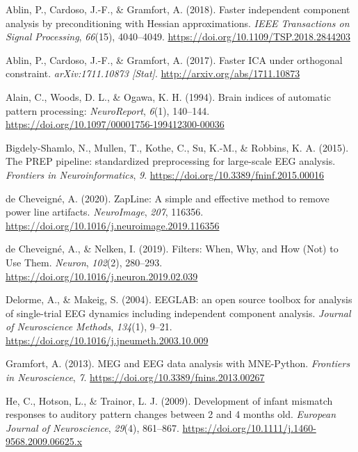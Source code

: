 \documentclass[stu,a4paper,11pt,floatsintext]{apa7}
\newenvironment{cslreferences}%
  {\setlength{\parindent}{0pt}%
  \everypar{\setlength{\hangindent}{\cslhangindent}}\ignorespaces}%
  {\par}
\newlength{\cslhangindent}
\begin{document}
\hypertarget{refs}{}
\begin{cslreferences}
\leavevmode\hypertarget{ref-ablinFasterIndependentComponent2018}{}%
Ablin, P., Cardoso, J.-F., \& Gramfort, A. (2018). Faster independent
component analysis by preconditioning with Hessian approximations.
\emph{IEEE Transactions on Signal Processing}, \emph{66}(15),
4040--4049. \url{https://doi.org/10.1109/TSP.2018.2844203}

\leavevmode\hypertarget{ref-ablinFasterICAOrthogonal2017}{}%
Ablin, P., Cardoso, J.-F., \& Gramfort, A. (2017). Faster ICA under
orthogonal constraint. \emph{arXiv:1711.10873 {[}Stat{]}}.
\url{http://arxiv.org/abs/1711.10873}

\leavevmode\hypertarget{ref-alainBrainIndicesAutomatic1994}{}%
Alain, C., Woods, D. L., \& Ogawa, K. H. (1994). Brain indices of
automatic pattern processing: \emph{NeuroReport}, \emph{6}(1), 140--144.
\url{https://doi.org/10.1097/00001756-199412300-00036}

\leavevmode\hypertarget{ref-bigdely-shamloPREPPipelineStandardized2015}{}%
Bigdely-Shamlo, N., Mullen, T., Kothe, C., Su, K.-M., \& Robbins, K. A.
(2015). The PREP pipeline: standardized preprocessing for large-scale
EEG analysis. \emph{Frontiers in Neuroinformatics}, \emph{9}.
\url{https://doi.org/10.3389/fninf.2015.00016}

\leavevmode\hypertarget{ref-decheveigneZapLineSimpleEffective2020}{}%
de Cheveigné, A. (2020). ZapLine: A simple and effective method to
remove power line artifacts. \emph{NeuroImage}, \emph{207}, 116356.
\url{https://doi.org/10.1016/j.neuroimage.2019.116356}

\leavevmode\hypertarget{ref-decheveigneFiltersWhenWhy2019}{}%
de Cheveigné, A., \& Nelken, I. (2019). Filters: When, Why, and How
(Not) to Use Them. \emph{Neuron}, \emph{102}(2), 280--293.
\url{https://doi.org/10.1016/j.neuron.2019.02.039}

\leavevmode\hypertarget{ref-delormeEEGLABOpenSource2004}{}%
Delorme, A., \& Makeig, S. (2004). EEGLAB: an open source toolbox for
analysis of single-trial EEG dynamics including independent component
analysis. \emph{Journal of Neuroscience Methods}, \emph{134}(1), 9--21.
\url{https://doi.org/10.1016/j.jneumeth.2003.10.009}

\leavevmode\hypertarget{ref-gramfortMEGEEGData2013}{}%
Gramfort, A. (2013). MEG and EEG data analysis with MNE-Python.
\emph{Frontiers in Neuroscience}, \emph{7}.
\url{https://doi.org/10.3389/fnins.2013.00267}

\leavevmode\hypertarget{ref-heDevelopmentInfantMismatch2009}{}%
He, C., Hotson, L., \& Trainor, L. J. (2009). Development of infant
mismatch responses to auditory pattern changes between 2 and 4 months
old. \emph{European Journal of Neuroscience}, \emph{29}(4), 861--867.
\url{https://doi.org/10.1111/j.1460-9568.2009.06625.x}


\end{cslreferences}
\end{document}
